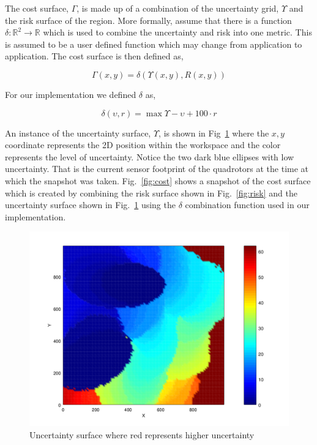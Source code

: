 \documentclass{article}
\begin{document}
The cost surface, $\Gamma$, is made up of a combination of the uncertainty
grid, $\Upsilon$ and the risk surface of the region. More formally, assume that
there is a function $\delta : \mathbb{R}^2 \rightarrow \mathbb{R}$ which is
used to combine the uncertainty and risk into one metric. This is assumed to be
a user defined function which may change from application to application. The
cost surface is then defined as,

$$\Gamma(x, y) = \delta(\Upsilon(x, y), R(x, y))$$

For our implementation we defined $\delta$ as,

$$\delta(\upsilon, r) = \max{\Upsilon} - \upsilon + 100 \cdot r$$

An instance of the uncertainty surface, $\Upsilon$, is shown in
Fig~\ref{fig:unc} where the $x, y$ coordinate represents the 2D position within
the workspace and the color represents the level of uncertainty. Notice the two
dark blue ellipses with low uncertainty. That is the current sensor footprint
of the quadrotors at the time at which the snapshot was taken.
Fig.~\ref{fig:cost} shows a snapshot of the cost surface which is created by
combining the risk surface shown in Fig.~\ref{fig:risk} and the uncertainty
surface shown in Fig.~\ref{fig:unc} using the $\delta$ combination function
used in our implementation.

\begin{figure}[h!]

    \includegraphics[width=1\columnwidth]{tasefigs/uncertainty.png}

    \caption{Uncertainty surface where red represents higher uncertainty}

    \label{fig:unc}

\end{figure}
\end{document}
